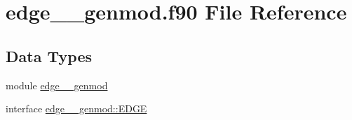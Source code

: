 \hypertarget{edge____genmod_8f90}{\section{edge\+\_\+\+\_\+genmod.\+f90 File Reference}
\label{edge____genmod_8f90}
}
\subsection*{Data Types}
\begin{DoxyCompactItemize}
\item 
module \hyperlink{classedge____genmod}{edge\+\_\+\+\_\+genmod}
\item 
interface \hyperlink{interfaceedge____genmod_1_1EDGE}{edge\+\_\+\+\_\+genmod\+::\+E\+D\+G\+E}
\end{DoxyCompactItemize}
